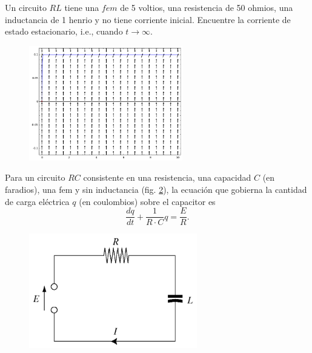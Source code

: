 	\begin{problema}
		Un circuito $RL$ tiene una $fem$ de 5 voltios, una resistencia de 50 ohmios, una inductancia de 1 henrio y no tiene corriente inicial. Encuentre la corriente de estado estacionario, i.e., cuando $t\to \infty.$
	\end{problema}
	



	\begin{figure}
		\centering
		\includegraphics[height=5cm,keepaspectratio=true]{./edo/img020504.png}
		\label{fig:020504}
	\end{figure}
	




	Para un circuito $RC$ consistente en una resistencia, una capacidad $C$ (en faradios), una fem y sin inductancia (fig. \ref{fig:020503}), la ecuación que gobierna la cantidad de carga eléctrica $q$ (en coulombios) sobre el capacitor es
	\begin{equation}
		\label{bron:7.10}
		\dfrac{dq}{dt}+\frac{1}{R\cdot C}q=\dfrac{E}{R}.
	\end{equation}
	



	\begin{figure}
		\centering
		\includegraphics[height=5cm,keepaspectratio=true]{./edo/img020503.png}
		\label{fig:020503}
	\end{figure}
	



